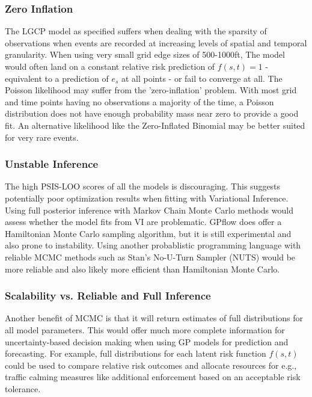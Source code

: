 \subsubsection{Zero Inflation}


The LGCP model as specified suffers when dealing with the sparsity of observations when events are recorded at increasing levels of spatial and temporal granularity. When using very small grid edge sizes of 500-1000ft, The model would often land on a constant relative risk prediction of $f(s,t)=1$ - equivalent to a prediction of $e_s$ at all points - or fail to converge at all. The Poisson likelihood may suffer from the 'zero-inflation' problem. With most grid and time points having no observations a majority of the time, a Poisson distribution does not have enough probability mass near zero to provide a good fit. An alternative likelihood like the Zero-Inflated Binomial may be better suited for very rare events. \par

\subsubsection{Unstable Inference}

The high PSIS-LOO scores of all the models is discouraging. This suggests potentially poor optimization results when fitting with Variational Inference. Using full posterior inference with Markov Chain Monte Carlo methods would assess whether the model fits from VI are problematic. GPflow does offer a Hamiltonian Monte Carlo sampling algorithm, but it is still experimental and also prone to instability. Using another probablistic programming language with reliable MCMC methods such as Stan's No-U-Turn Sampler (NUTS) would be more reliable and also likely more efficient than Hamiltonian Monte Carlo.


\subsubsection{Scalability vs. Reliable and Full Inference}

Another benefit of MCMC is that it will return estimates of full distributions for all model parameters. This would offer much more complete information for uncertainty-based decision making when using GP models for prediction and forecasting. For example, full distributions for each latent risk function $f(s,t)$ could be used to compare relative risk outcomes and allocate resources for e.g., traffic calming measures like additional enforcement based on an acceptable risk tolerance. \par

